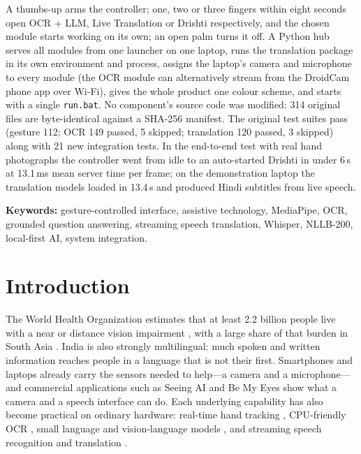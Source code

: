 \documentclass[12pt,singleside,a4paper]{article}
\begin{document}
A thumbs-up arms the controller; one, two or three fingers within eight seconds open OCR + LLM, Live Translation or Drishti respectively, and the chosen module starts working on its own; an open palm turns it off. A Python hub serves all modules from one launcher on one laptop, runs the translation package in its own environment and process, assigns the laptop's camera and microphone to every module (the OCR module can alternatively stream from the DroidCam phone app over Wi-Fi), gives the whole product one colour scheme, and starts with a single \texttt{run.bat}. No component's source code was modified: 314 original files are byte-identical against a SHA-256 manifest. The original test suites pass (gesture 112; OCR 149 passed, 5 skipped; translation 120 passed, 3 skipped) along with 21 new integration tests. In the end-to-end test with real hand photographs the controller went from idle to an auto-started Drishti in under 6\,s at 13.1\,ms mean server time per frame; on the demonstration laptop the translation models loaded in 13.4\,s and produced Hindi subtitles from live speech.

\vspace{0.3cm}
\noindent\textbf{Keywords:} gesture-controlled interface, assistive technology, MediaPipe, OCR, grounded question answering, streaming speech translation, Whisper, NLLB-200, local-first AI, system integration.
\pagebreak
\listoffigures
{}
\vspace{1em}
\listoftables
{}
\pagebreak
{\footnotesize\setlength{\parskip}{0pt}\linespread{0.92}\selectfont\tableofcontents}
\pagebreak

\section{Introduction}
The World Health Organization estimates that at least 2.2 billion people live with a near or distance vision impairment \cite{who2019}, with a large share of that burden in South Asia \cite{bourne2017}. India is also strongly multilingual: much spoken and written information reaches people in a language that is not their first. Smartphones and laptops already carry the sensors needed to help---a camera and a microphone---and commercial applications such as Seeing AI \cite{seeingai} and Be My Eyes \cite{bemyeyes} show what a camera and a speech interface can do. Each underlying capability has also become practical on ordinary hardware: real-time hand tracking \cite{zhang2020mediapipe}, CPU-friendly OCR \cite{du2020ppocr}, small language and vision-language models \cite{gemma3,marafioti2025}, and streaming speech recognition and translation \cite{radford2023,machacek2023,nllb2022}.
\end{document}
